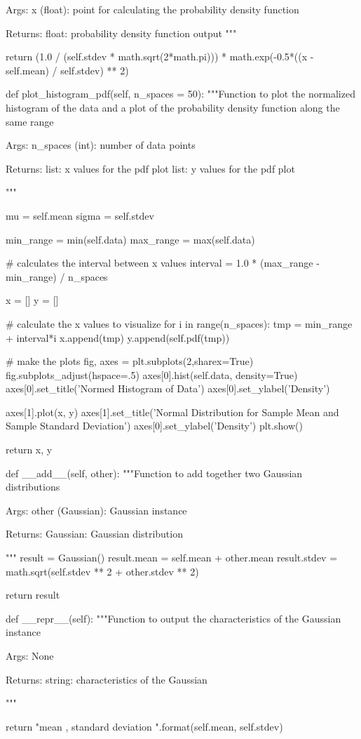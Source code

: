 \begin{python}
			Args:
			x (float): point for calculating the probability density function
			
			
			Returns:
			float: probability density function output
			"""
			
			return (1.0 / (self.stdev * math.sqrt(2*math.pi))) * math.exp(-0.5*((x - self.mean) / self.stdev) ** 2)
		
		def plot_histogram_pdf(self, n_spaces = 50):
			"""Function to plot the normalized histogram of the data and a plot of 	the 
			probability density function along the same range
			
			Args:
			n_spaces (int): number of data points 
			
			Returns:
			list: x values for the pdf plot
			list: y values for the pdf plot
			
			"""
			
			mu = self.mean
			sigma = self.stdev
			
			min_range = min(self.data)
			max_range = max(self.data)
			
			# calculates the interval between x values
			interval = 1.0 * (max_range - min_range) / n_spaces
			
			x = []
			y = []
			
			# calculate the x values to visualize
			for i in range(n_spaces):
			tmp = min_range + interval*i
			x.append(tmp)
			y.append(self.pdf(tmp))
			
			# make the plots
			fig, axes = plt.subplots(2,sharex=True)
			fig.subplots_adjust(hspace=.5)
			axes[0].hist(self.data, density=True)
			axes[0].set_title('Normed Histogram of Data')
			axes[0].set_ylabel('Density')
			
			axes[1].plot(x, y)
			axes[1].set_title('Normal Distribution for \n Sample Mean and Sample Standard Deviation')
			axes[0].set_ylabel('Density')
			plt.show()
			
			return x, y
		
		def __add__(self, other):
			"""Function to add together two Gaussian distributions
			
			Args:
			other (Gaussian): Gaussian instance
			
			Returns:
			Gaussian: Gaussian distribution
			
			"""
			result = Gaussian()
			result.mean = self.mean + other.mean
			result.stdev = math.sqrt(self.stdev ** 2 + other.stdev ** 2)
			
			return result
		
		def __repr__(self):
			"""Function to output the characteristics of the Gaussian instance
			
			Args:
			None
			
			Returns:
			string: characteristics of the Gaussian
			
			"""
			
			return "mean {}, standard deviation {}".format(self.mean, self.stdev)
\end{python}

